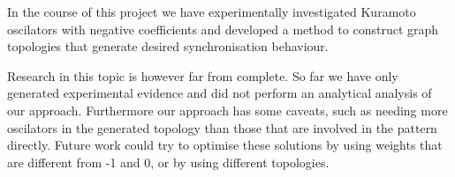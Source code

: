 \label{sec:conclusion}

In the course of this project we have experimentally investigated Kuramoto oscilators with negative coefficients and developed a method to construct graph topologies that generate desired synchronisation behaviour. 

Research in this topic is however far from complete. So far we have only generated experimental evidence and did not perform an analytical analysis of our approach. Furthermore our approach has some caveats, such as needing more oscilators in the generated topology than those that are involved in the pattern directly. Future work could try to optimise these solutions by using weights that are different from -1 and 0, or by using different topologies. 